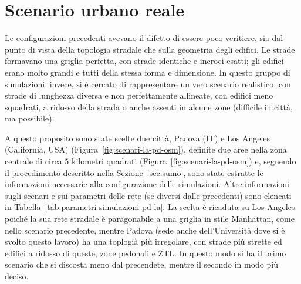 \section{Scenario urbano reale} %
Le configurazioni precedenti avevano il difetto di essere poco veritiere, sia dal punto di vista della topologia stradale
che sulla geometria degli edifici.
Le strade formavano una griglia perfetta, con strade identiche e incroci esatti;
gli edifici erano molto grandi e tutti della stessa forma e dimensione.
In questo gruppo di simulazioni, invece, si è cercato di rappresentare un vero scenario realistico,
con strade di lunghezza diversa e non perfettamente allineate,
con edifici meno squadrati, a ridosso della strada o anche assenti in alcune zone (difficile in città, ma possibile).

A questo proposito sono state scelte due città, Padova (IT) e Los Angeles (California, USA) (Figura~\ref{fig:scenari-la-pd-osm}), definite due aree nella zona centrale di circa $5$ kilometri quadrati (Figura~\ref{fig:scenari-la-pd-osm})
e, seguendo il procedimento descritto nella Sezione~\ref{sec:sumo}, sono state estratte le informazioni necessarie alla configurazione delle simulazioni.
Altre informazioni sugli scenari e sui parametri delle rete (se diversi dalle precedenti) sono elencati in Tabella~\ref{tab:parametri-simulazioni-pd-la}.
La scelta è ricaduta su Los Angeles poiché la sua rete stradale è paragonabile a una griglia in stile Manhattan, come nello scenario precedente,
mentre Padova (sede anche dell'Università dove si è svolto questo lavoro) ha una toplogià più irregolare, con strade più strette ed edifici a ridosso di queste,
zone pedonali e ZTL.
In questo modo si ha il primo scenario che si discosta meno dal precendete, mentre il secondo in modo più deciso.
%
